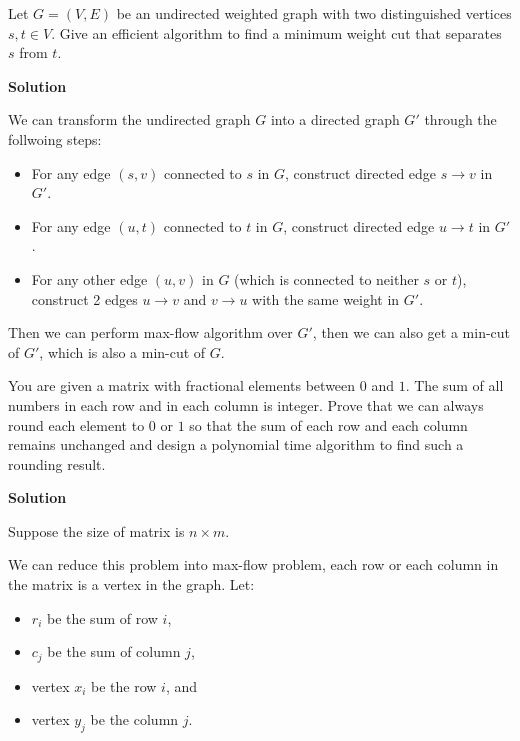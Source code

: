 \documentclass{article}
\newcounter{exercise}
\newcommand{\<}{
    \langle}
\renewcommand{\>}{
    \rangle}
\begin{document}
{\newpage

\begin{exercise}
Let $G=(V,E)$ be an undirected weighted graph with two distinguished vertices $s,t\in V$. Give an efficient algorithm to find a minimum weight cut that separates $s$ from $t$.
\end{exercise}

\bigskip \noindent
\textbf{Solution}

We can transform the undirected graph $G$ into a directed graph $G'$ through the follwoing steps:
\begin{itemize}
    \item For any edge $(s, v)$ connected to $s$ in $G$, construct directed edge $s \rightarrow v$ in $G'$.
    \item For any edge $(u, t)$ connected to $t$ in $G$, construct directed edge $u \rightarrow t$ in $G'$.
    \item For any other edge $(u, v)$ in $G$ (which is connected to neither $s$ or $t$), construct 2 edges $u \rightarrow v$ and $v \rightarrow u$ with the same weight in $G'$.
\end{itemize}

Then we can perform max-flow algorithm over $G'$, then we can also get a min-cut of $G'$, which is also a min-cut of $G$. 

\begin{exercise}
You are given a matrix with fractional elements between $0$ and $1$. The sum of all numbers in each row and in each column is integer. Prove that we can always round each element to $0$ or $1$ so that the sum of each row and each column remains unchanged and design a polynomial time algorithm to find such a rounding result.
\end{exercise}

\bigskip \noindent
\textbf{Solution}

Suppose the size of matrix is $n \times m$.

We can reduce this problem into max-flow problem, each row or each column in the matrix is a vertex in the graph. Let:
\begin{itemize}
    \item $r_i$ be the sum of row $i$,
    \item $c_j$ be the sum of column $j$,
    \item vertex $x_i$ be the row $i$, and
    \item vertex $y_j$ be the column $j$.
\end{itemize}

}
\end{document}
